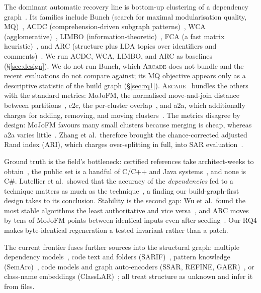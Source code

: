 The dominant automatic recovery line is bottom-up clustering of a dependency
graph~\cite{ducasse2009sar,shtern2012clustering,sarhan2022clustering}. Its families include Bunch
(search for maximal modularisation quality, MQ)~\cite{mancoridis1998mq,bunch}, ACDC
(comprehension-driven subgraph patterns)~\cite{acdc}, WCA (agglomerative)~\cite{wca}, LIMBO
(information-theoretic)~\cite{limbo}, FCA (a fast matrix
heuristic)~\cite{teymourian2022fca,zhang2023sarif}, and ARC (structure plus LDA topics over
identifiers and comments)~\cite{arc}. We run ACDC, WCA, LIMBO, and ARC as baselines
(\S\ref{sec:design}). We do not run Bunch, which \textsc{Arcade} does not bundle and the recent
evaluations do not compare against; its MQ objective appears only as a descriptive statistic of
the build graph (\S\ref{sec:rq1}). \textsc{Arcade}~\cite{arcade} bundles the others with the
standard metrics: MoJoFM, the normalised move-and-join distance between
partitions~\cite{tzerpos1999mojo,mojofm}, c2c, the per-cluster overlap~\cite{garcia-comparative},
and a2a, which additionally charges for adding, removing, and moving clusters~\cite{le2015a2a}.
The metrics disagree by design: MoJoFM favours many small clusters because merging is cheap,
whereas a2a varies little~\cite{lutellier2018measuring,zhang2023sarif}. Zhang et al.\ therefore
brought the chance-corrected adjusted Rand index (ARI), which charges over-splitting in full, into
SAR evaluation~\cite{zhang2023sarif,jabeen2026gaer}.

Ground truth is the field's bottleneck: certified references take architect-weeks to
obtain~\cite{garcia2013groundtruth}, the public set is a handful of C/C++ and Java
systems~\cite{lutellier-deps,zhang2023sarif}, and none is C\#. Lutellier et al.\ showed that the
accuracy of the \emph{dependencies} fed to a technique matters as much as the
technique~\cite{lutellier-deps,lutellier2018measuring}, a finding our build-graph-first design
takes to its conclusion. Stability is the second gap: Wu et al.\ found the most stable algorithms
the least authoritative and vice versa~\cite{wu2005comparison}, and ARC moves by tens of MoJoFM
points between identical inputs even after seeding~\cite{link2019value}. Our RQ4 makes
byte-identical regeneration a tested invariant rather than a patch.

The current frontier fuses further sources into the structural graph: multiple dependency
models~\cite{altinisik2024multidep}, code text and folders (SARIF)~\cite{zhang2023sarif},
pattern knowledge (SemArc)~\cite{zhao2026semarc}, code models and graph auto-encoders (SSAR,
REFINE, GAER)~\cite{ding2026ssar,zhang2026refine,jabeen2026gaer}, or class-name embeddings
(ClassLAR)~\cite{he2025classlar}; all treat structure as unknown and infer it from files.

